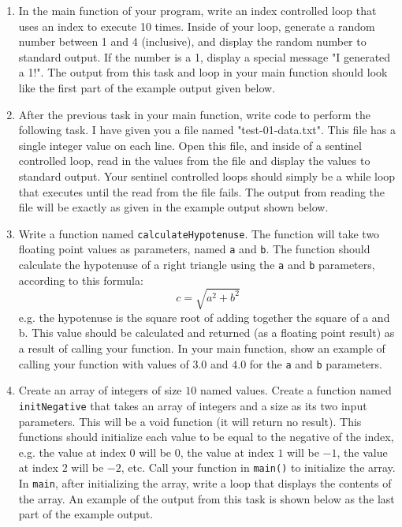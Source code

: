 \documentclass[11pt]{article}
\begin{document}
\begin{enumerate}
\item In the main function of your program, write an index controlled
loop that uses an index to execute 10 times.  Inside of your loop,
generate a random number between 1 and 4 (inclusive), and display
the random number to standard output.  If the number is a 1,
display a special message "I generated a 1!".  The output from this
task and loop in your main function should look like the first part
of the example output given below.

\item After the previous task in your main function, write code to
perform the following task.  I have given you a file named
"test-01-data.txt".  This file has a single integer value on each
line.  Open this file, and inside of a sentinel controlled loop,
read in the values from the file and display the values to standard
output.  Your sentinel controlled loops should simply be a while
loop that executes until the read from the file fails.  The output
from reading the file will be exactly as given in the example
output shown below.

\item Write a function named \verb~calculateHypotenuse~.  The function will
take two floating point values as parameters, named \verb~a~ and \verb~b~.
The function should calculate the hypotenuse of a right triangle
using the \verb~a~ and \verb~b~ parameters, according to this formula: $$ c =
   \sqrt{a^2 + b^2} $$ e.g. the hypotenuse is the square root of
adding together the square of a and b.  This value should be
calculated and returned (as a floating point result) as a result of
calling your function.  In your main function, show an example of
calling your function with values of $3.0$ and $4.0$ for the \verb~a~
and \verb~b~ parameters.

\item Create an array of integers of size $10$ named values.  Create a
function named \verb~initNegative~ that takes an array of integers and a
size as its two input parameters.  This will be a void function (it
will return no result).  This functions should initialize each
value to be equal to the negative of the index, e.g. the value at
index $0$ will be $0$, the value at index $1$ will be $-1$, the
value at index $2$ will be $-2$, etc.  Call your function in
\verb~main()~ to initialize the array.  In \verb~main~, after initializing
the array, write a loop that displays the contents of the array.
An example of the output from this task is shown below as the last
part of the example output.
\end{enumerate}
\end{document}

